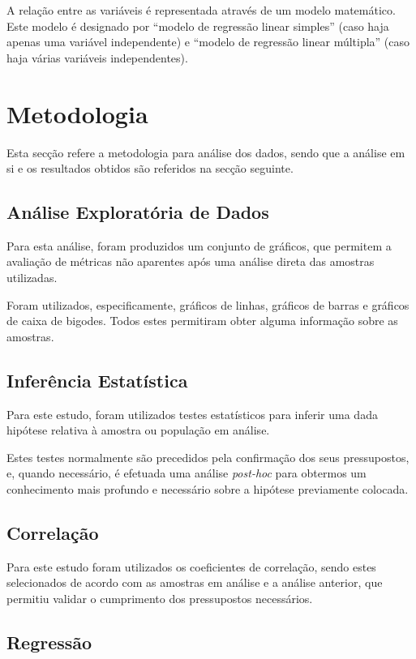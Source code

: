 \documentclass[conference]{IEEEtran}
\begin{document}
A relação entre as variáveis é representada através de um modelo matemático. Este modelo é designado por ``modelo de regressão linear simples'' (caso haja apenas uma variável independente) e ``modelo de regressão linear múltipla'' (caso haja várias variáveis independentes).

\section{Metodologia}

Esta secção refere a metodologia para análise dos dados, sendo que a análise em si e os resultados obtidos são referidos na secção seguinte.

\subsection{Análise Exploratória de Dados}

Para esta análise, foram produzidos um conjunto de gráficos, que permitem a avaliação de métricas não aparentes após uma análise direta das amostras utilizadas.

Foram utilizados, especificamente, gráficos de linhas, gráficos de barras e gráficos de caixa de bigodes. Todos estes permitiram obter alguma informação sobre as amostras.

\subsection{Inferência Estatística}

Para este estudo, foram utilizados testes estatísticos para inferir uma dada hipótese relativa à amostra ou população em análise.

Estes testes normalmente são precedidos pela confirmação dos seus pressupostos, e, quando necessário, é efetuada uma análise \textit{post-hoc} para obtermos um conhecimento mais profundo e necessário sobre a hipótese previamente colocada.

\subsection{Correlação}

Para este estudo foram utilizados os coeficientes de correlação, sendo estes selecionados de acordo com as amostras em análise e a análise anterior, que permitiu validar o cumprimento dos pressupostos necessários.

\subsection{Regressão}
\end{document}

